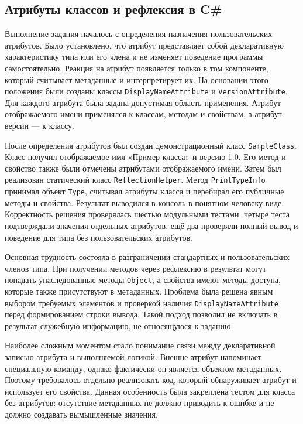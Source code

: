 \subsection{Атрибуты классов и рефлексия в C\#}

Выполнение задания началось с определения назначения пользовательских атрибутов. Было установлено, что атрибут представляет собой декларативную характеристику типа или его члена и не изменяет поведение программы самостоятельно. Реакция на атрибут появляется только в том компоненте, который считывает метаданные и интерпретирует их. На основании этого положения были созданы классы \texttt{DisplayNameAttribute} и \texttt{VersionAttribute}. Для каждого атрибута была задана допустимая область применения. Атрибут отображаемого имени применялся к классам, методам и свойствам, а атрибут версии --- к классу.

После определения атрибутов был создан демонстрационный класс \texttt{SampleClass}. Класс получил отображаемое имя «Пример класса» и версию 1.0. Его метод и свойство также были отмечены атрибутами отображаемого имени. Затем был реализован статический класс \texttt{ReflectionHelper}. Метод \texttt{PrintTypeInfo} принимал объект \texttt{Type}, считывал атрибуты класса и перебирал его публичные методы и свойства. Результат выводился в консоль в понятном человеку виде. Корректность решения проверялась шестью модульными тестами: четыре теста подтверждали значения отдельных атрибутов, ещё два проверяли полный вывод и поведение для типа без пользовательских атрибутов.

Основная трудность состояла в разграничении стандартных и пользовательских членов типа. При получении методов через рефлексию в результат могут попадать унаследованные методы \texttt{Object}, а свойства имеют методы доступа, которые также присутствуют в метаданных. Проблема была решена явным выбором требуемых элементов и проверкой наличия \texttt{DisplayNameAttribute} перед формированием строки вывода. Такой подход позволил не включать в результат служебную информацию, не относящуюся к заданию.

Наиболее сложным моментом стало понимание связи между декларативной записью атрибута и выполняемой логикой. Внешне атрибут напоминает специальную команду, однако фактически он является объектом метаданных. Поэтому требовалось отдельно реализовать код, который обнаруживает атрибут и использует его свойства. Данная особенность была закреплена тестом для класса без атрибутов: отсутствие метаданных не должно приводить к ошибке и не должно создавать вымышленные значения.

